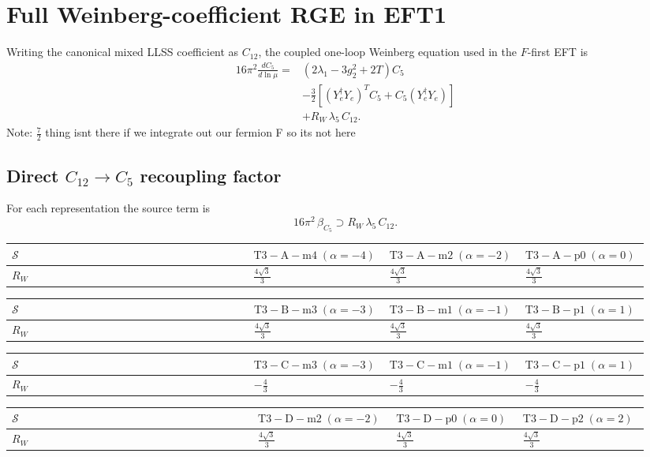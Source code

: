 \documentclass[9pt]{article}
\begin{document}
\section*{Full Weinberg-coefficient RGE in EFT1}
Writing the canonical mixed LLSS coefficient as $C_{12}$, the coupled one-loop Weinberg equation used in the $F$-first EFT is
\begin{align}
16\pi^2\frac{dC_5}{d\ln\mu}={}&(2\lambda_1-3g_2^2+2T)C_5\\
&-\frac32\left[(Y_e^\dagger Y_e)^T C_5+C_5(Y_e^\dagger Y_e)\right]\\
&+R_W\,\lambda_5\,C_{12}.
\end{align}
Note: $\frac{7}{2}$ thing isnt there if we integrate out our fermion F so its not here \subsection*{Direct $C_{12}\to C_5$ recoupling factor}
For each representation the source term is
\[16\pi^2\,\beta_{C_5}\supset R_W\,\lambda_5\,C_{12}.\]
\begin{longtable}{@{}p{0.37\linewidth}p{0.19\linewidth}p{0.19\linewidth}p{0.19\linewidth}@{}}
\toprule
$\mathcal{S}$ & $ \mathrm{T3-A-m4}\;(\alpha=-4) $ & $ \mathrm{T3-A-m2}\;(\alpha=-2) $ & $ \mathrm{T3-A-p0}\;(\alpha=0) $ \\
\midrule
$R_W$ & $ \frac{4 \sqrt{3}}{3} $ & $ \frac{4 \sqrt{3}}{3} $ & $ \frac{4 \sqrt{3}}{3} $ \\
\bottomrule
\end{longtable}
\begin{longtable}{@{}p{0.37\linewidth}p{0.19\linewidth}p{0.19\linewidth}p{0.19\linewidth}@{}}
\toprule
$\mathcal{S}$ & $ \mathrm{T3-B-m3}\;(\alpha=-3) $ & $ \mathrm{T3-B-m1}\;(\alpha=-1) $ & $ \mathrm{T3-B-p1}\;(\alpha=1) $ \\
\midrule
$R_W$ & $ \frac{4 \sqrt{3}}{3} $ & $ \frac{4 \sqrt{3}}{3} $ & $ \frac{4 \sqrt{3}}{3} $ \\
\bottomrule
\end{longtable}
\begin{longtable}{@{}p{0.37\linewidth}p{0.19\linewidth}p{0.19\linewidth}p{0.19\linewidth}@{}}
\toprule
$\mathcal{S}$ & $ \mathrm{T3-C-m3}\;(\alpha=-3) $ & $ \mathrm{T3-C-m1}\;(\alpha=-1) $ & $ \mathrm{T3-C-p1}\;(\alpha=1) $ \\
\midrule
$R_W$ & $ - \frac{4}{3} $ & $ - \frac{4}{3} $ & $ - \frac{4}{3} $ \\
\bottomrule
\end{longtable}
\begin{longtable}{@{}p{0.37\linewidth}p{0.19\linewidth}p{0.19\linewidth}p{0.19\linewidth}@{}}
\toprule
$\mathcal{S}$ & $ \mathrm{T3-D-m2}\;(\alpha=-2) $ & $ \mathrm{T3-D-p0}\;(\alpha=0) $ & $ \mathrm{T3-D-p2}\;(\alpha=2) $ \\
\midrule
$R_W$ & $ \frac{4 \sqrt{3}}{3} $ & $ \frac{4 \sqrt{3}}{3} $ & $ \frac{4 \sqrt{3}}{3} $ \\
\bottomrule
\end{longtable}
\end{document}
